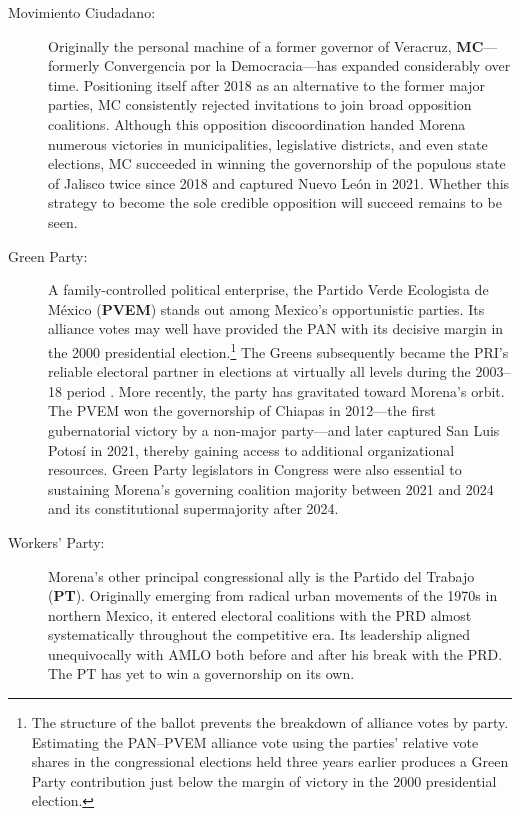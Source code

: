 \documentclass[letter,12pt]{article}
\begin{document}
\begin{description}
\item[Movimiento Ciudadano:] Originally the personal machine of a former governor of Veracruz, \textbf{MC}---formerly Convergencia por la Democracia---has expanded considerably over time. Positioning itself after 2018 as an alternative to the former major parties, MC consistently rejected invitations to join broad opposition coalitions. Although this opposition discoordination handed Morena numerous victories in municipalities, legislative districts, and even state elections, MC succeeded in winning the governorship of the populous state of Jalisco twice since 2018 and captured Nuevo León in 2021. Whether this strategy to become the sole credible opposition will succeed remains to be seen.

\item[Green Party:] A family-controlled political enterprise, the Partido Verde Ecologista de México (\textbf{PVEM}) stands out among Mexico's opportunistic parties. Its alliance votes may well have provided the PAN with its decisive margin in the 2000 presidential election.\footnote{The structure of the ballot prevents the breakdown of alliance votes by party. Estimating the PAN--PVEM alliance vote using the parties’ relative vote shares in the congressional elections held three years earlier produces a Green Party contribution just below the margin of victory in the 2000 presidential election.} The Greens subsequently became the PRI's reliable electoral partner in elections at virtually all levels during the 2003--18 period \citep{spoon.pulido.PRI-PVEM2017}. More recently, the party has gravitated toward Morena's orbit. The PVEM won the governorship of Chiapas in 2012---the first gubernatorial victory by a non-major party---and later captured San Luis Potosí in 2021, thereby gaining access to additional organizational resources. Green Party legislators in Congress were also essential to sustaining Morena's governing coalition majority between 2021 and 2024 and its constitutional supermajority after 2024. 

\item[Workers' Party:] Morena's other principal congressional ally is the Partido del Trabajo (\textbf{PT}). Originally emerging from radical urban movements of the 1970s in northern Mexico, it entered electoral coalitions with the PRD almost systematically throughout the competitive era. Its leadership aligned unequivocally with AMLO both before and after his break with the PRD. The PT has yet to win a governorship on its own.
\end{description}
\end{document}
